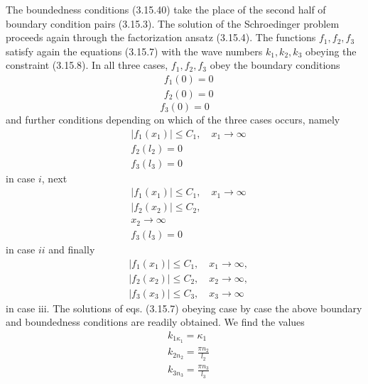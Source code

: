 \documentclass{article}
\begin{document}
The boundedness conditions (3.15.40) take the place of the second half of boundary condition pairs (3.15.3). The solution of the Schroedinger problem proceeds again through the factorization ansatz (3.15.4). The functions $f_{1}, f_{2}, f_{3}$ satisfy again the equations (3.15.7) with the wave numbers $k_{1}, k_{2}, k_{3}$ obeying the constraint (3.15.8). In all three cases, $f_{1}, f_{2}, f_{3}$ obey the boundary conditions
$$
\begin{align*}
& f_{1}(0)=0  \tag{3.15.42a}\\
& f_{2}(0)=0 \tag{3.15.42b}
\end{align*}
$$
$$
\begin{equation*}
f_{3}(0)=0 \tag{3.15.42c}
\end{equation*}
$$
and further conditions depending on which of the three cases occurs, namely
$$
\begin{align*}
& \left|f_{1}\left(x_{1}\right)\right| \leq C_{1}, \quad x_{1} \rightarrow \infty  \tag{3.15.43a}\\
& f_{2}\left(l_{2}\right)=0  \tag{3.15.43b}\\
& f_{3}\left(l_{3}\right)=0 \tag{3.15.43c}
\end{align*}
$$
in case $i$, next
$$
\begin{align*}
& \left|f_{1}\left(x_{1}\right)\right| \leq C_{1}, \quad x_{1} \rightarrow \infty  \tag{3.15.44a}\\
& \left|f_{2}\left(x_{2}\right)\right| \leq C_{2},  \tag{3.15.44b}\\
& x_{2} \rightarrow \infty  \tag{3.15.44c}\\
& f_{3}\left(l_{3}\right)=0
\end{align*}
$$
in case $i i$ and finally
$$
\begin{align*}
& \left|f_{1}\left(x_{1}\right)\right| \leq C_{1}, \quad x_{1} \rightarrow \infty,  \tag{3.15.45a}\\
& \left|f_{2}\left(x_{2}\right)\right| \leq C_{2}, \quad x_{2} \rightarrow \infty,  \tag{3.15.45b}\\
& \left|f_{3}\left(x_{3}\right)\right| \leq C_{3}, \quad x_{3} \rightarrow \infty \tag{3.15.45c}
\end{align*}
$$
in case iii. The solutions of eqs. (3.15.7) obeying case by case the above boundary and boundedness conditions are readily obtained. We find the values
$$
\begin{align*}
& k_{1 \kappa_{1}}=\kappa_{1}  \tag{3.15.46a}\\
& k_{2 n_{2}}=\frac{\pi n_{2}}{l_{2}}  \tag{3.15.46b}\\
& k_{3 n_{3}}=\frac{\pi n_{3}}{l_{3}} \tag{3.15.46c}
\end{align*}
$$
\end{document}
